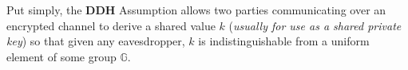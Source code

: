 \documentclass[../CryptoHW3.tex]{subfiles}
\begin{document}
\begin{flushleft}



 Put simply, the \textbf{DDH} Assumption allows two parties communicating over an encrypted channel to derive a shared value $k$ (\emph{usually for use as a shared private key}) so that given any eavesdropper, $k$ is indistinguishable from a uniform element of some group $\mathbb{G}$.  


























\end{flushleft}
\end{document}
